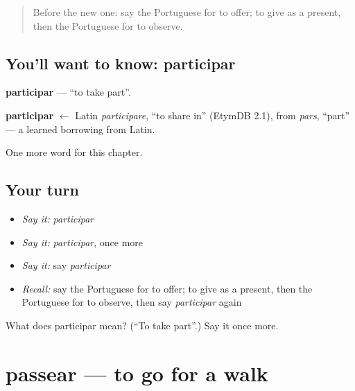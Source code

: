 \label{lesson:PT-C205-participar}



\begin{quote}
Before the new one: say the Portuguese for to offer; to give as a present, then the Portuguese for to observe.
\end{quote}

\subsection*{You'll want to know: participar}
\textbf{participar} — \textquotedblleft{}to take part\textquotedblright{}.

\begin{cousinweb}
\textbf{participar} $\leftarrow$ Latin \emph{participare}, \textquotedblleft{}to share in\textquotedblright{} (EtymDB 2.1), from \emph{pars}, \textquotedblleft{}part\textquotedblright{} — a learned borrowing from Latin.
\end{cousinweb}

\begin{grammarlens}[title={What you've built}]
One more word for this chapter.
\end{grammarlens}

\subsection*{Your turn}
\begin{itemize}
\raggedright
  \item \emph{Say it:} \emph{participar}
  \item \emph{Say it:} \emph{participar}, once more
  \item \emph{Say it:} say \emph{participar}
  \item \emph{Recall:} say the Portuguese for to offer; to give as a present, then the Portuguese for to observe, then say \emph{participar} again
\end{itemize}

\begin{tcolorbox}[breakable,colback=teal!4,colframe=teal!35!black,title={Before you move on}]
What does participar mean? (\textquotedblleft{}To take part\textquotedblright{}.) Say it once more.
\end{tcolorbox}
\section[passear]{passear — to go for a walk}

